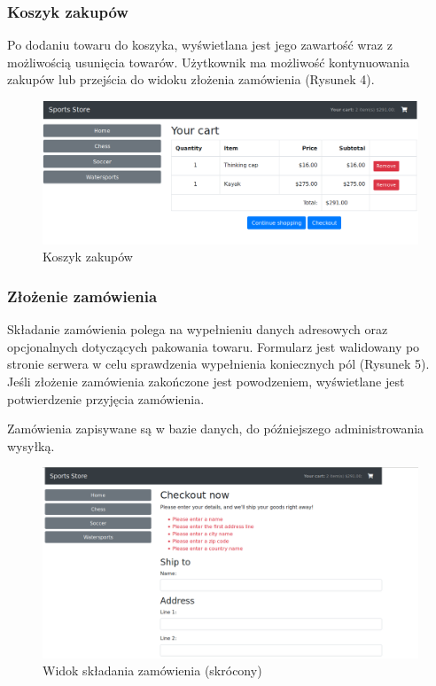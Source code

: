 \documentclass[a4paper,10pt]{article}
\begin{document}
\subsubsection{Koszyk zakupów}
Po dodaniu towaru do koszyka, wyświetlana jest jego zawartość wraz z możliwością usunięcia towarów. Użytkownik ma możliwość kontynuowania zakupów lub przejścia do widoku złożenia zamówienia (Rysunek 4).

\begin{figure}
 \centering
 \includegraphics[width=\linewidth]{Images/cart.png}
 \caption{Koszyk zakupów}
 \label{rys:}
\end{figure}
\subsubsection{Złożenie zamówienia}
Składanie zamówienia polega na wypełnieniu danych adresowych oraz opcjonalnych dotyczących pakowania towaru. Formularz jest walidowany po stronie serwera w celu sprawdzenia wypełnienia koniecznych pól (Rysunek 5). Jeśli złożenie zamówienia zakończone jest powodzeniem, wyświetlane jest potwierdzenie przyjęcia zamówienia.
\par 
Zamówienia zapisywane są w bazie danych, do późniejszego administrowania wysyłką.

\begin{figure}
 \centering
 \includegraphics[width=\linewidth]{Images/checkout.png}
 \caption{Widok składania zamówienia (skrócony)}
 \label{rys:}
\end{figure}
\end{document}
